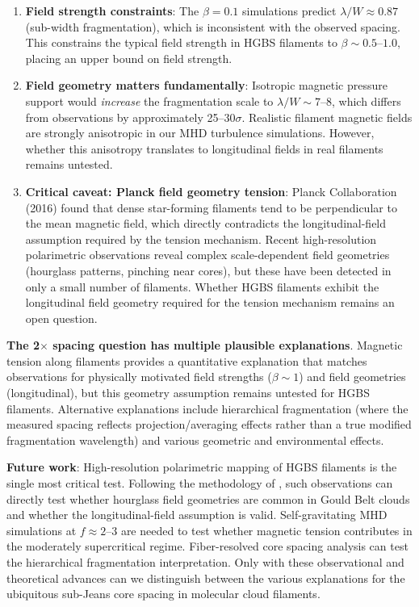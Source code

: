 \documentclass[11pt,a4paper]{article}
\begin{document}
\begin{enumerate}
    \item \textbf{Field strength constraints}: The $\beta = 0.1$ simulations predict $\lambda/W \approx 0.87$ (sub-width fragmentation), which is inconsistent with the observed spacing. This constrains the typical field strength in HGBS filaments to $\beta \sim 0.5$--$1.0$, placing an upper bound on field strength.

    \item \textbf{Field geometry matters fundamentally}: Isotropic magnetic pressure support would \textit{increase} the fragmentation scale to $\lambda/W \sim 7$--$8$, which differs from observations by approximately 25--$30\sigma$. Realistic filament magnetic fields are strongly anisotropic in our MHD turbulence simulations. However, whether this anisotropy translates to longitudinal fields in real filaments remains untested.

    \item \textbf{Critical caveat: Planck field geometry tension}: Planck Collaboration (2016) found that dense star-forming filaments tend to be perpendicular to the mean magnetic field, which directly contradicts the longitudinal-field assumption required by the tension mechanism. Recent high-resolution polarimetric observations reveal complex scale-dependent field geometries (hourglass patterns, pinching near cores), but these have been detected in only a small number of filaments. Whether HGBS filaments exhibit the longitudinal field geometry required for the tension mechanism remains an open question.
\end{enumerate}

\textbf{The 2$\times$ spacing question has multiple plausible explanations}. Magnetic tension along filaments provides a quantitative explanation that matches observations for physically motivated field strengths ($\beta \sim 1$) and field geometries (longitudinal), but this geometry assumption remains untested for HGBS filaments. Alternative explanations include hierarchical fragmentation (where the measured spacing reflects projection/averaging effects rather than a true modified fragmentation wavelength) and various geometric and environmental effects.

\textbf{Future work}: High-resolution polarimetric mapping of HGBS filaments is the single most critical test. Following the methodology of \citet{Jadhav2026}, such observations can directly test whether hourglass field geometries are common in Gould Belt clouds and whether the longitudinal-field assumption is valid. Self-gravitating MHD simulations at $f \approx 2$--$3$ are needed to test whether magnetic tension contributes in the moderately supercritical regime. Fiber-resolved core spacing analysis can test the hierarchical fragmentation interpretation. Only with these observational and theoretical advances can we distinguish between the various explanations for the ubiquitous sub-Jeans core spacing in molecular cloud filaments.
\end{document}
